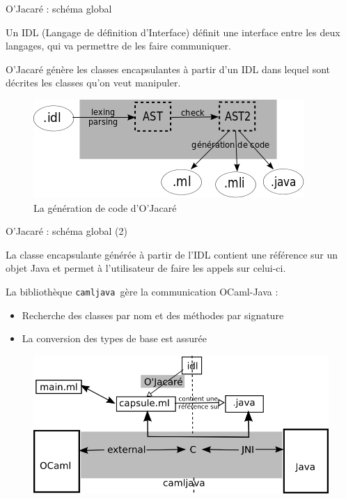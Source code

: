 \documentclass[xcolor={table,dvipsnames}]{beamer}
\newcommand{\camljava}{{\tt{camljava}}}
\begin{document}
\begin{frame}{O'Jacaré : schéma global }

\begin{definition}
Un \alert{IDL} (Langage de définition d'Interface) définit une interface entre les deux langages, qui va permettre de les faire communiquer.
\end{definition}

O'Jacaré génère les classes encapsulantes à partir d'un IDL dans lequel sont décrites les classes qu'on veut manipuler.
\medskip
\begin{figure}[h]
  \centering
  \includegraphics[scale=0.6]{schemaOjacare.png}
  \caption{La génération de code d'O'Jacaré}
\end{figure}

\end{frame}


\begin{frame}{O'Jacaré : schéma global (2) }
  \begin{definition}
    La \alert{classe encapsulante} générée à partir de l'IDL contient une référence sur un objet Java et permet à l'utilisateur de faire les appels sur celui-ci.
  \end{definition}
La bibliothèque \camljava \ gère la communication OCaml-Java :
\begin{itemize}
\item Recherche des classes par nom et des méthodes par signature
\item La conversion des types de base est assurée
\end{itemize}
\begin{figure}[h!]
  \centering
  \includegraphics[scale=0.8]{schemaCamljava2.png}
\end{figure}

\end{frame}
\end{document}
